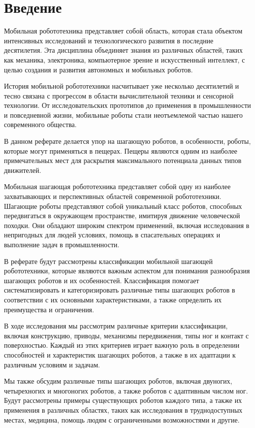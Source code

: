 \section*{Введение}

Мобильная робототехника представляет собой область, которая стала объектом интенсивных исследований и технологического развития в последние десятилетия. Эта дисциплина объединяет знания из различных областей, таких как механика, электроника, компьютерное зрение и искусственный интеллект, с целью создания и развития автономных и мобильных роботов.

История мобильной робототехники насчитывает уже несколько десятилетий и тесно связана с прогрессом в области вычислительной техники и сенсорной технологии. От исследовательских прототипов до применения в промышленности и повседневной жизни, мобильные роботы стали неотъемлемой частью нашего современного общества.

В данном реферате делается упор на шагающую роботов, в особенности, роботы, которые могут применяться в пещерах. Пещеры являются одним из наиболее примечательных мест для раскрытия максимального потенциала данных типов движителей.

Мобильная шагающая робототехника представляет собой одну из наиболее захватывающих и перспективных областей современной робототехники. Шагающие роботы представляют собой уникальный класс роботов, способных передвигаться в окружающем пространстве, имитируя движение человеческой походки. Они обладают широким спектром применений, включая исследования в непригодных для людей условиях, помощь в спасательных операциях и выполнение задач в промышленности.

В реферате будут рассмотрены классификации мобильной шагающей робототехники, которые являются важным аспектом для понимания разнообразия шагающих роботов и их особенностей. Классификация помогает систематизировать и категоризировать различные типы шагающих роботов в соответствии с их основными характеристиками, а также определить их преимущества и ограничения.

В ходе исследования мы рассмотрим различные критерии классификации, включая конструкцию, приводы, механизмы передвижения, типы ног и контакт с поверхностью. Каждый из этих критериев играет важную роль в определении способностей и характеристик шагающих роботов, а также в их адаптации к различным условиям и задачам.

Мы также обсудим различные типы шагающих роботов, включая двуногих, четырехногих и многоногих роботов, а также роботов с адаптивным числом ног. Будут рассмотрены примеры существующих роботов каждого типа, а также их применения в различных областях, таких как исследования в труднодоступных местах, медицина, помощь людям с ограниченными возможностями и другие.

